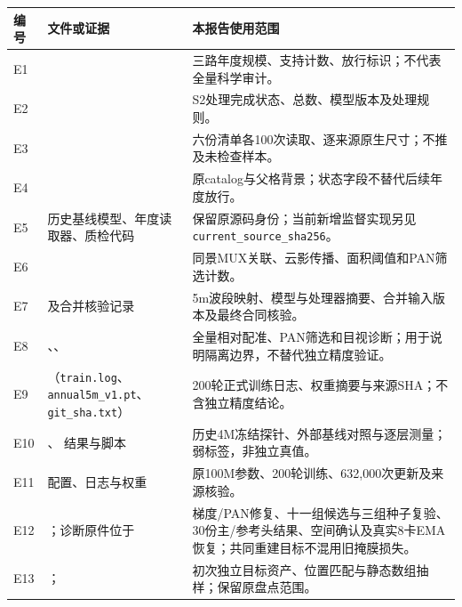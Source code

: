 \documentclass[UTF8,fontset=fandol,zihao=5,a4paper]{ctexart}
\renewcommand{\arraystretch}{1.25}
\begin{document}
\begingroup\small\renewcommand{\arraystretch}{1.1}
\noindent\begin{tabularx}{\linewidth}{@{}p{.8cm}p{5.4cm}Y@{}}
\toprule 编号 & 文件或证据 & 本报告使用范围\\\midrule
E1 &  & 三路年度规模、支持计数、放行标识；不代表全量科学审计。\\
E2 &  & S2处理完成状态、总数、模型版本及处理规则。\\
E3 &  & 六份清单各100次读取、逐来源原生尺寸；不推及未检查样本。\\
E4 &  & 原catalog与父格背景；状态字段不替代后续年度放行。\\
E5 & 历史基线模型、年度读取器、质检代码 & 保留原源码身份；当前新增监督实现另见\texttt{current\_source\_sha256}。\\
E6 &  & 同景MUX关联、云影传播、面积阈值和PAN筛选计数。\\
E7 &  及合并核验记录 & 5m波段映射、模型与处理器摘要、合并输入版本及最终合同核验。\\
E8 & 、、 & 全量相对配准、PAN筛选和目视诊断；用于说明隔离边界，不替代独立精度验证。\\
E9 & （\texttt{train.log}、\texttt{annual5m\_v1.pt}、\texttt{git\_sha.txt}） & 200轮正式训练日志、权重摘要与来源SHA；不含独立精度结论。\\
E10 & 、 结果与脚本 & 历史4M冻结探针、外部基线对照与逐层测量；弱标签，非独立真值。\\
E11 &  配置、日志与权重 & 原100M参数、200轮训练、632{,}000次更新及来源核验。\\
E12 & ；诊断原件位于 & 梯度/PAN修复、十一组候选与三组种子复验、30份主/参考头结果、空间确认及真实8卡EMA恢复；共同重建目标不混用旧掩膜损失。\\
E13 & ； & 初次独立目标资产、位置匹配与静态数组抽样；保留原盘点范围。\\

\end{tabularx}
\end{document}
